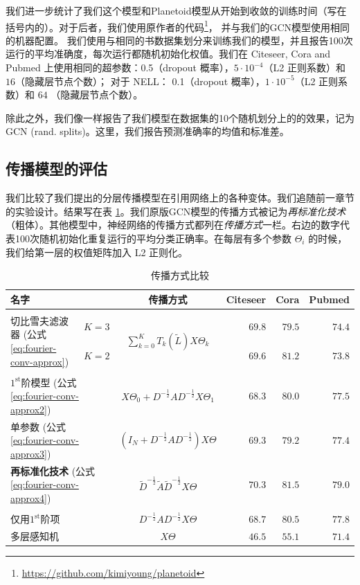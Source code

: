 \documentclass{article} %
\begin{document}
我们进一步统计了我们这个模型和Planetoid模型从开始到收敛的训练时间（写在括号内的）。对于后者，我们使用原作者的代码\footnote{\url{https://github.com/kimiyoung/planetoid}}， 并与我们的GCN模型使用相同的机器配置。 我们使用与\cite{yang2016revisiting}相同的书数据集划分来训练我们的模型，并且报告100次运行的平均准确度，每次运行都随机初始化权值。我们在 Citeseer, Cora and Pubmed 上使用相同的超参数：0.5（dropout 概率），$5\cdot 10^{-4}$（L2 正则系数）和 $16$（隐藏层节点个数）； 对于 NELL： 0.1（dropout 概率），$1\cdot 10^{-5}$（L2 正则系数）和 $64$ （隐藏层节点个数）。

除此之外，我们像\cite{yang2016revisiting}一样报告了我们模型在数据集的10个随机划分上的的效果，记为GCN (rand.\@\xspace splits)。这里，我们报告预测准确率的均值和标准差。

\subsection{传播模型的评估}
我们比较了我们提出的分层传播模型在引用网络上的各种变体。我们追随前一章节的实验设计。结果写在表 \ref{tab:results_model_eval}。我们原版GCN模型的传播方式被记为\textit{再标准化技术}（粗体）。其他模型中，神经网络的传播方式都列在\textit{传播方式}一栏。右边的数字代表100次随机初始化重复运行的平均分类正确率。在每层有多个参数 $\Theta_i$ 的时候，我们给第一层的权值矩阵加入 L2 正则化。

\begin{table}[htp]
\centering
\caption{\label{tab:results_model_eval}传播方式比较}
\begin{tabular}{l c c r r r}
\textbf{名字} & & \textbf{传播方式} & \textbf{Citeseer} & \textbf{Cora} & \textbf{Pubmed} \\[0.05em]\hline \\[-0.8em]

\multirow{2}{*}{切比雪夫滤波器 (公式 \ref{eq:fourier-conv-approx})} & $K=3$  & \multirow{2}{*}{$\sum_{k=0}^K  T_k(\tilde{L}) X \Theta_k$} & $69.8$& $79.5$ & $74.4$    \\
  & $K=2$ &  & $69.6$& $81.2$ & $73.8$    \\[0.05em]\hline \\[-0.9em]
\multicolumn{2}{l}{$1^{\text{st}}$阶模型 (公式 \ref{eq:fourier-conv-approx2})}  & $X\Theta_0 + D^{-\frac{1}{2}}AD^{-\frac{1}{2}}X\Theta_1$ & $68.3$& $80.0$ & $77.5$ \\
\multicolumn{2}{l}{单参数 (公式 \ref{eq:fourier-conv-approx3})} & $(I_N + D^{-\frac{1}{2}}AD^{-\frac{1}{2}})X\Theta$ & $69.3$& $79.2$ & $77.4$ \\
\multicolumn{2}{l}{\textbf{再标准化技术} (公式 \ref{eq:fourier-conv-approx4})}& $\tilde{D}^{-\frac{1}{2}}\tilde{A}\tilde{D}^{-\frac{1}{2}}X\Theta$ & $\mathbf{70.3}$ & $\mathbf{81.5}$ & $\mathbf{79.0}$   \\[0.25em]\hline \\[-0.9em]
\multicolumn{2}{l}{仅用$1^{\text{st}}$阶项}
 & $D^{-\frac{1}{2}}AD^{-\frac{1}{2}}X\Theta$ & $68.7$ & $80.5$ & $77.8$ \\
\multicolumn{2}{l}{多层感知机} & $X\Theta$ & $46.5$ & $55.1$ & $71.4$ \\
\end{tabular}
\end{table}
\end{document}
